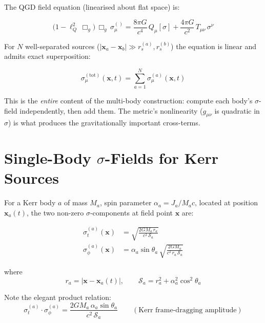 \documentclass[11pt,a4paper]{article}
\theoremstyle{definition}
\theoremstyle{remark}
\newcommand{\sig}[2]{\sigma_{#1}^{(#2)}}
\newcommand{\lQ}{\ell_{Q}}
\newcommand{\boldx}{\mathbf{x}}
\begin{document}
	The QGD field equation (linearised about flat space) is:
	
	\begin{equation}\label{eq:field_eq}
		\bigl(1 - \lQ^2\,\Box_g\bigr)\,\Box_g\,\sig{\mu}{} = 
		\frac{8\pi G}{c^4}\,Q_\mu[\sigma]
		+ \frac{4\pi G}{c^2}\,T_{\mu\nu}\,\sigma^\nu
	\end{equation}
	
	For $N$ well-separated sources
	($|\boldx_a-\boldx_b|\gg r_s^{(a)},r_s^{(b)}$) the equation is linear
	and admits exact superposition:
	
	\begin{equation}\label{eq:superposition}
		\boxed{\sig{\mu}{\mathrm{tot}}(\boldx,t)
			= \sum_{a=1}^{N}\sig{\mu}{a}(\boldx,t)}
	\end{equation}
	
	This is the \emph{entire} content of the multi-body construction: compute
	each body's $\sigma$-field independently, then add them.  The metric's
	nonlinearity ($g_{\mu\nu}$ is quadratic in $\sigma$) is what produces
	the gravitationally important cross-terms.
	
	\section{Single-Body $\sigma$-Fields for Kerr Sources}
	\label{sec:single_body}
	
	For a Kerr body $a$ of mass $M_a$, spin parameter $\alpha_a=J_a/M_ac$,
	located at position $\boldx_a(t)$, the two non-zero $\sigma$-components
	at field point $\boldx$ are:
	
	\begin{align}
		\sig{t}{a}(\boldx) &= \sqrt{\frac{2GM_a\,r_a}{c^2\,\mathcal{S}_a}}
		\label{eq:sigma_t_kerr}\\[6pt]
		\sig{\phi}{a}(\boldx) &= \alpha_a\sin\theta_a\,
		\sqrt{\frac{2GM_a}{c^2\,r_a\,\mathcal{S}_a}}
		\label{eq:sigma_phi_kerr}
	\end{align}
	
	where
	\begin{equation}
		r_a = |\boldx-\boldx_a(t)|,\qquad
		\mathcal{S}_a = r_a^2 + \alpha_a^2\cos^2\theta_a
	\end{equation}
	
	Note the elegant product relation:
	\begin{equation}\label{eq:product_relation}
		\sig{t}{a}\cdot\sig{\phi}{a}
		= \frac{2GM_a\,\alpha_a\sin\theta_a}{c^2\,\mathcal{S}_a}
		\qquad(\text{Kerr frame-dragging amplitude})
	\end{equation}
	
\end{document}
